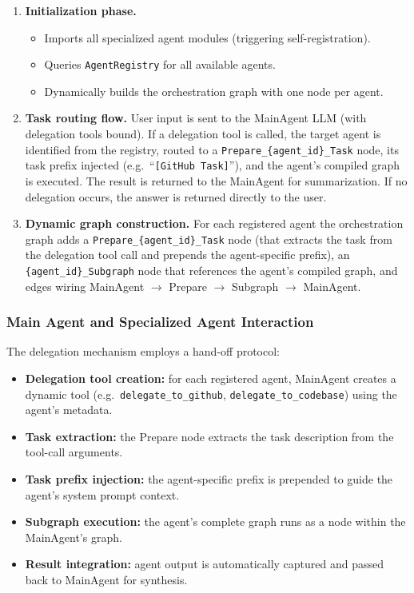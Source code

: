 \documentclass[11pt,a4paper]{report}
\newcommand{\code}[1]{\texttt{\small #1}}
\begin{document}
\begin{enumerate}
  \item \textbf{Initialization phase.}
  \begin{itemize}
    \item Imports all specialized agent modules (triggering self-registration).
    \item Queries \code{AgentRegistry} for all available agents.
    \item Dynamically builds the orchestration graph with one node per agent.
  \end{itemize}
  \item \textbf{Task routing flow.} User input is sent to the MainAgent LLM (with delegation tools bound). If a delegation tool is called, the target agent is identified from the registry, routed to a \code{Prepare\_\{agent\_id\}\_Task} node, its task prefix injected (e.g.\ ``\code{[GitHub Task]}''), and the agent's compiled graph is executed. The result is returned to the MainAgent for summarization. If no delegation occurs, the answer is returned directly to the user.
  \item \textbf{Dynamic graph construction.} For each registered agent the orchestration graph adds a \code{Prepare\_\{agent\_id\}\_Task} node (that extracts the task from the delegation tool call and prepends the agent-specific prefix), an \code{\{agent\_id\}\_Subgraph} node that references the agent's compiled graph, and edges wiring MainAgent $\rightarrow$ Prepare $\rightarrow$ Subgraph $\rightarrow$ MainAgent.
\end{enumerate}

\subsubsection{Main Agent and Specialized Agent Interaction}

The delegation mechanism employs a hand-off protocol:

\begin{itemize}
  \item \textbf{Delegation tool creation:} for each registered agent, MainAgent creates a dynamic tool (e.g.\ \code{delegate\_to\_github}, \code{delegate\_to\_codebase}) using the agent's metadata.
  \item \textbf{Task extraction:} the Prepare node extracts the task description from the tool-call arguments.
  \item \textbf{Task prefix injection:} the agent-specific prefix is prepended to guide the agent's system prompt context.
  \item \textbf{Subgraph execution:} the agent's complete graph runs as a node within the MainAgent's graph.
  \item \textbf{Result integration:} agent output is automatically captured and passed back to MainAgent for synthesis.
\end{itemize}
\end{document}
